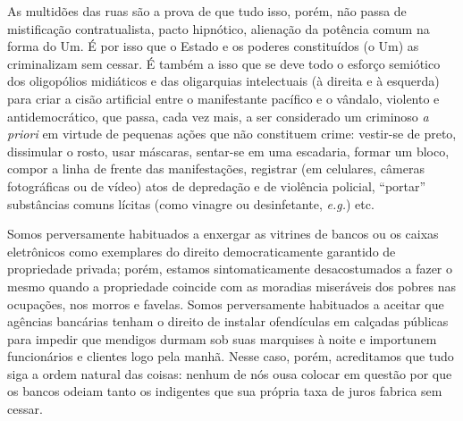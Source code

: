 As multidões das ruas são a prova de que tudo isso, porém, não passa de
mistificação contratualista, pacto hipnótico, alienação da potência
comum na forma do Um. É por isso que o Estado e os poderes constituídos
(o Um) as criminalizam sem cessar. É também a isso que se deve todo o
esforço semiótico dos oligopólios midiáticos e das oligarquias
intelectuais (à direita e à esquerda) para criar a cisão artificial
entre o manifestante pacífico e o vândalo, violento e antidemocrático,
que passa, cada vez mais, a ser considerado um criminoso \emph{a priori}
em virtude de pequenas ações que não constituem crime: vestir-se de
preto, dissimular o rosto, usar máscaras, sentar-se em uma escadaria,
formar um bloco, compor a linha de frente das manifestações, registrar
(em celulares, câmeras fotográficas ou de vídeo) atos de depredação e de
violência policial, ``portar'' substâncias comuns lícitas (como vinagre
ou desinfetante, \emph{e.g.}) etc.

Somos perversamente habituados a enxergar as vitrines de bancos ou os
caixas eletrônicos como exemplares do direito democraticamente garantido
de propriedade privada; porém, estamos sintomaticamente desacostumados a
fazer o mesmo quando a propriedade coincide com as moradias miseráveis
dos pobres nas ocupações, nos morros e favelas. Somos perversamente
habituados a aceitar que agências bancárias tenham o direito de instalar
ofendículas em calçadas públicas para impedir que mendigos durmam sob
suas marquises à noite e importunem funcionários e clientes logo pela
manhã. Nesse caso, porém, acreditamos que tudo siga a ordem natural das
coisas: nenhum de nós ousa colocar em questão por que os bancos odeiam
tanto os indigentes que sua própria taxa de juros fabrica sem cessar.

